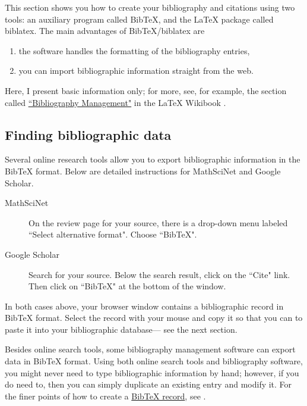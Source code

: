 \documentclass[11pt]{amsart}
\theoremstyle{theorem} %
\theoremstyle{definition}                  %
\theoremstyle{example}                       %
\theoremstyle{remark}                       %
\numberwithin{equation}{section}
\begin{document}
This section shows you how to create your bibliography and citations using two tools: an auxiliary program called BibTeX, and the LaTeX package called biblatex. 
The main advantages of BibTeX/biblatex are
\begin{enumerate}
\item the software handles the formatting of the bibliography entries,
\item you can import bibliographic information straight from the web.
\end{enumerate}
Here, I present basic information only; for more, see, for example, the section called 
\href{https://en.wikibooks.org/wiki/LaTeX/Bibliography_Management}{``Bibliography Management"} in the LaTeX Wikibook \cite[\S 5.3]{wikibook}.

\subsection{Finding bibliographic data}

Several online research tools allow you to export bibliographic information in the BibTeX format. Below are detailed instructions for MathSciNet and Google Scholar.

\begin{description}
\item[MathSciNet]
On the review page for your source, there is a drop-down menu labeled ``Select alternative format". Choose ``BibTeX". 
\item[Google Scholar]
Search for your source. Below the search result, click on the ``Cite" link. Then click on ``BibTeX" at the bottom of the window. 
\end{description}
In both cases above, your browser window contains a bibliographic record in BibTeX format. Select the record with your mouse and copy it so that you can to paste it into your bibliographic database--- see the next section.

Besides online search tools, some bibliography management software  can export data in BibTeX format. Using both online search tools and bibliography software, you might never need to type bibliographic information by hand; however, if you do need to, then you can simply duplicate an existing entry and modify it. For the finer points of how to create a \href{https://en.wikibooks.org/wiki/LaTeX/Bibliography_Management}{BibTeX record}, see \cite[\S 5.3.3.1--5]{wikibook}.
\end{document}
